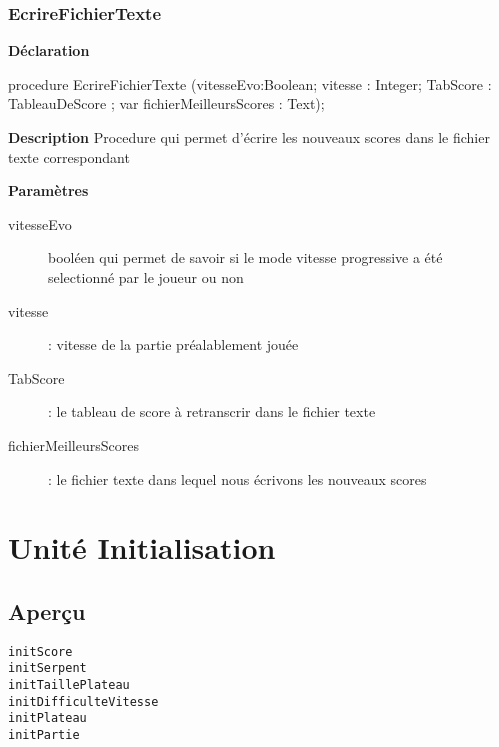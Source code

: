 \documentclass{report}
\newif\ifpdf
\begin{document}
\subsection*{EcrireFichierTexte}
\fi
\label{GestionScore-EcrireFichierTexte}
\begin{list}{}{
\setlength{\itemindent}{0cm}
\setlength{\listparindent}{0cm}
\setlength{\leftmargin}{\evensidemargin}
\addtolength{\leftmargin}{\tmplength}
\settowidth{\labelsep}{X}
\addtolength{\leftmargin}{\labelsep}
\setlength{\labelwidth}{\tmplength}
}
\item[\textbf{Déclaration}\hfill]
\ifpdf
\begin{flushleft}
\fi
\begin{ttfamily}
procedure EcrireFichierTexte (vitesseEvo:Boolean; vitesse : Integer; TabScore : TableauDeScore ; var fichierMeilleursScores : Text);\end{ttfamily}

\ifpdf
\end{flushleft}
\fi

\par
\item[\textbf{Description}]
Procedure qui permet d'écrire les nouveaux scores dans le fichier texte correspondant    \par
\item[\textbf{Paramètres}]
\begin{description}
\item[vitesseEvo] booléen qui permet de savoir si le mode vitesse progressive a été selectionné par le joueur ou non
\item[vitesse] : vitesse de la partie préalablement jouée
\item[TabScore] : le tableau de score à retranscrir dans le fichier texte
\item[fichierMeilleursScores] : le fichier texte dans lequel nous écrivons les nouveaux scores
\end{description}


\end{list}
\chapter{Unité Initialisation}
\label{Initialisation}
\section{Aperçu}
\begin{description}
\item[\texttt{initScore}]
\item[\texttt{initSerpent}]
\item[\texttt{initTaillePlateau}]
\item[\texttt{initDifficulteVitesse}]
\item[\texttt{initPlateau}]
\item[\texttt{initPartie}]
\end{description}
\end{document}
